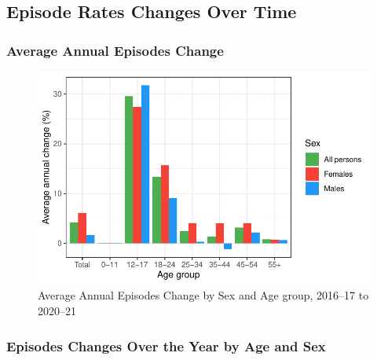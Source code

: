 \documentclass[
  a4paper,
  DIV=11,
  numbers=noendperiod]{scrreport}
\begin{document}
\hypertarget{episode-rates-changes-over-time}{%
\subsection{Episode Rates Changes Over
Time}\label{episode-rates-changes-over-time}}

\hypertarget{average-annual-episodes-change}{%
\subsubsection{Average Annual Episodes
Change}\label{average-annual-episodes-change}}

\begin{figure}

\caption{\label{fig-rmhc-asa}Average Annual Episodes Change by Sex and
Age group, 2016--17 to 2020--21}

{\centering \includegraphics{./chap4-rmhc_files/figure-pdf/fig-rmhc-asa-1.pdf}

}

\end{figure}

\hypertarget{episodes-changes-over-the-year-by-age-and-sex}{%
\subsubsection{Episodes Changes Over the Year by Age and
Sex}\label{episodes-changes-over-the-year-by-age-and-sex}}
\end{document}
